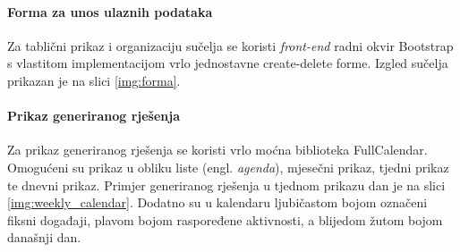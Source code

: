 \documentclass[times, utf8, zavrsni]{fer}
\begin{document}
\paragraph{Forma za unos ulaznih podataka} Za tablični prikaz i organizaciju sučelja se koristi \textit{front-end} radni okvir Bootstrap s vlastitom implementacijom vrlo jednostavne create-delete forme. Izgled sučelja prikazan je na slici \ref{img:forma}.

\paragraph{Prikaz generiranog rješenja} Za prikaz generiranog rješenja se koristi vrlo moćna biblioteka FullCalendar. Omogućeni su prikaz u obliku liste (engl. \textit{agenda}), mjesečni prikaz, tjedni prikaz te dnevni prikaz. Primjer generiranog rješenja u tjednom prikazu dan je na slici \ref{img:weekly_calendar}. Dodatno su u kalendaru ljubičastom bojom označeni fiksni događaji, plavom bojom raspoređene aktivnosti, a blijedom žutom bojom današnji dan.
\end{document}
